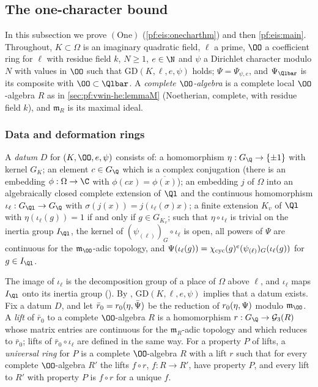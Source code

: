 \subsection{The one-character bound}\label{sec:pf:eis:onechar}

In this subsection we prove $(\mathrm{One})$ (\cref{pf:eis:onecharthm}) and then \cref{pf:eis:main}. Throughout,
$K\subset\Omega$ is an imaginary quadratic field, $\ell$ a prime, $\OO$ a coefficient ring for $\ell$ with residue field
$k$, $N\ge1$, $e\in\N$ and $\psi$ a Dirichlet character modulo $N$ with values in $\OO$ such that
$\mathrm{GD}(K,\ell,e,\psi)$ holds; $\Psi=\Psi_{\psi,e}$, and $\Psi_{\Qlbar}$ is its composite with $\OO\subset\Qlbar$. A
\emph{complete $\OO$-algebra} is a complete local $\OO$-algebra $R$ as in \cref{sec:pf:vwin-he:lemmaM} (Noetherian,
complete, with residue field $k$), and $\mathfrak m_R$ is its maximal ideal.

\subsubsection{Data and deformation rings}

\begin{definition}[Data]\label{pf:eis:dat}
A \emph{datum} $D$ for $(K,\OO,e,\psi)$ consists of: a homomorphism $\eta:G_\Q\to\{\pm1\}$ with kernel $G_K$; an element
$c\in G_\Q$ which is a complex conjugation (there is an embedding $\phi:\Omega\to\C$ with $\phi(cx)=\overline{\phi(x)}$); an
embedding $j$ of $\Omega$ into an algebraically closed complete extension of $\Ql$ and the continuous homomorphism
$\iota_\ell:G_{\Ql}\to G_\Q$ with $\sigma(j(x))=j(\iota_\ell(\sigma)x)$; a finite extension $K_v$ of $\Ql$ with
$\eta(\iota_\ell(g))=1$ if and only if $g\in G_{K_v}$; such that $\eta\circ\iota_\ell$ is trivial on the inertia group
$I_{\Ql}$, the kernel of $(\psi_{(\ell)})_G\circ\iota_\ell$ is open, all powers of $\Psi$ are continuous for the
$\mathfrak m_\OO$-adic topology, and $\Psi(\iota_\ell(g))=\chi_{\mathrm{cyc}}(g)^e(\psi_{(\ell)})_G(\iota_\ell(g))$ for $g\in I_{\Ql}$.
\end{definition}

The image of $\iota_\ell$ is the decomposition group of a place of $\Omega$ above $\ell$, and $\iota_\ell$ maps $I_{\Ql}$ onto its
inertia group (). By
, $\mathrm{GD}(K,\ell,e,\psi)$ implies that a datum exists. Fix a datum $D$, and
let $\bar r_0=r_0(\eta,\bar\Psi)$ be the reduction of $r_0(\eta,\Psi)$ modulo $\mathfrak m_\OO$. A \emph{lift} of
$\bar r_0$ to a complete $\OO$-algebra $R$ is a homomorphism $r:G_\Q\to\eisGG(R)$ whose matrix entries are continuous for
the $\mathfrak m_R$-adic topology and which reduces to $\bar r_0$; lifts of $\bar r_0\circ\iota_\ell$ are defined in the same
way. For a property $P$ of lifts, a \emph{universal ring} for $P$ is a complete $\OO$-algebra $R$ with a lift $r$ such that
for every complete $\OO$-algebra $R'$ the lifts $f\circ r$, $f:R\to R'$, have property $P$, and every lift to $R'$ with
property $P$ is $f\circ r$ for a unique $f$.

